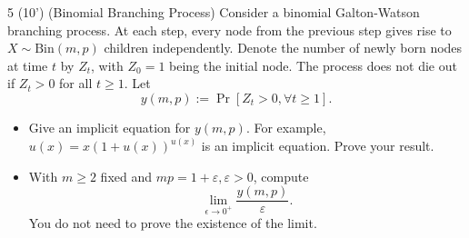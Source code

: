 \begin{question}{5 (10') (Binomial Branching Process)}
        Consider a binomial Galton-Watson branching process. At each step, every node from the previous step gives rise to $X\sim \text{Bin}(m, p)$ children independently. Denote the number of newly born nodes at time $t$ by $Z_t$, with $Z_0=1$ being the initial node. The process does not die out if $Z_t>0$ for all $t\ge 1$. Let 
        $$
        y(m, p):=\Pr[Z_t>0, \forall t\ge 1].
        $$ 
    \begin{itemize}
        \item[a. (5')] Give an implicit equation for $y(m,p)$. For example, $u(x)=x(1+u(x))^{u(x)}$ is an implicit equation. Prove your result. 
        
        \item[b. (5')] With $m\ge 2$ fixed and $mp=1+\varepsilon, \varepsilon>0$, compute 
        $$\lim_{\epsilon\to 0^+} \frac{y(m, p)}{\varepsilon}.$$
        You do not need to prove the existence of the limit.
        
    \end{itemize}
\end{question}

